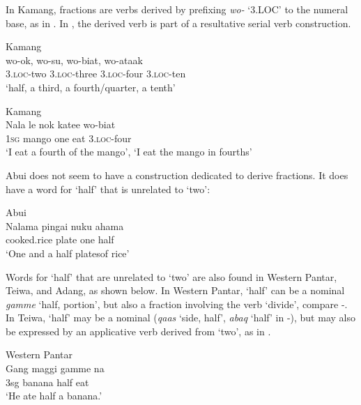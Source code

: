   

In Kamang, fractions are verbs derived by prefixing \textit{wo-} `3.LOC' to the numeral base, as in . In , the derived verb is part of a resultative serial verb construction.


\ea%
\label{bkm:Ref342746224}
{\upshape Kamang}\\
\gll wo-ok,    wo-su,  wo-biat,  wo-ataak     \\  
   3.\textsc{loc}-two    3.\textsc{loc}-three  3.\textsc{loc}-four  3.\textsc{loc}-ten   \\
\glt `half, a third, a fourth/quarter, a tenth' 
\z

   

 

 


\ea%
\label{bkm:Ref342746258}
{\upshape Kamang}\\
\gll  Nala  le  nok  katee  wo-biat  \\  
   \textsc{1sg} mango  one  eat  3.\textsc{loc}-four    \\
\glt `I eat a fourth of the mango', `I eat the mango in fourths'
\z

     

 

Abui does not seem to have a construction dedicated to derive fractions. It does have a word for `half' that is unrelated to `two':  


\ea
\label{ex:8:1249}
{\upshape Abui}\\
 \gll   Nalama  pingai  nuku  ahama   \\
    cooked.rice  plate  one  half   \\
 \glt  `One and a half platesof rice'  
\z

 
Words for `half' that are unrelated to `two' are also found in Western Pantar,  Teiwa, and Adang, as shown below.  In Western Pantar, `half' can be a nominal \textit{gamme} `half, portion', but also a fraction involving the verb `divide', compare -. In Teiwa, `half' may be a nominal (\textit{qaas} `side, half', \textit{abaq} `half' in -), but may also be expressed by an applicative verb derived from `two', as in .


\ea%
\label{bkm:Ref342746707}
{\upshape Western Pantar}\\
\gll   Gang  maggi  gamme  na  \\  
      3sg  banana  half  eat  \\
\glt  `He ate half a banana.'
\z








